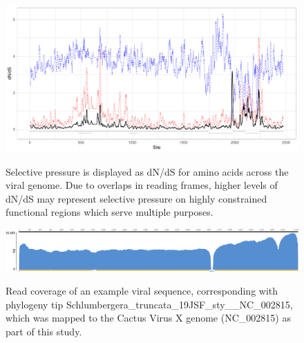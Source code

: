 \documentclass[fleqn,10pt,lineno]{wlpeerj}
\begin{document}
\begin{figure}
\centering
\caption{
Selective pressure is displayed as dN/dS for amino acids across the viral genome. Due to overlaps in reading frames, higher levels of dN/dS may represent selective pressure on highly constrained functional regions which serve multiple purposes.
}
\includegraphics[width=1\textwidth]{supplementaryinfo/selectionplot.pdf}
\label{fig:selectionplot}
\end{figure}
\clearpage


\begin{figure}
\centering
\caption{
Read coverage of an example viral sequence, corresponding with phylogeny tip Schlumbergera\_truncata\_19JSF\_sty\_\_NC\_002815, which was mapped to the Cactus Virus X genome (NC\_002815) as part of this study.
}
\includegraphics[width=1\textwidth]{figures/CVX-NC_002815-coverage-graph.pdf}	
\label{fig:coverage}
\end{figure}
\clearpage
\end{document}
